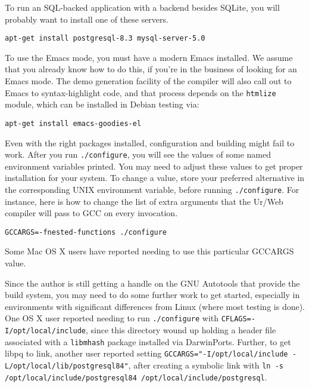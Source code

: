 \documentclass{article}
\begin{document}
To run an SQL-backed application with a backend besides SQLite, you will probably want to install one of these servers.

\begin{verbatim}
apt-get install postgresql-8.3 mysql-server-5.0
\end{verbatim}

To use the Emacs mode, you must have a modern Emacs installed.  We assume that you already know how to do this, if you're in the business of looking for an Emacs mode.  The demo generation facility of the compiler will also call out to Emacs to syntax-highlight code, and that process depends on the \texttt{htmlize} module, which can be installed in Debian testing via:

\begin{verbatim}
apt-get install emacs-goodies-el
\end{verbatim}

Even with the right packages installed, configuration and building might fail to work.  After you run \texttt{./configure}, you will see the values of some named environment variables printed.  You may need to adjust these values to get proper installation for your system.  To change a value, store your preferred alternative in the corresponding UNIX environment variable, before running \texttt{./configure}.  For instance, here is how to change the list of extra arguments that the Ur/Web compiler will pass to GCC on every invocation.

\begin{verbatim}
GCCARGS=-fnested-functions ./configure
\end{verbatim}

Some Mac OS X users have reported needing to use this particular GCCARGS value.

Since the author is still getting a handle on the GNU Autotools that provide the build system, you may need to do some further work to get started, especially in environments with significant differences from Linux (where most testing is done).  One OS X user reported needing to run \texttt{./configure} with \texttt{CFLAGS=-I/opt/local/include}, since this directory wound up holding a header file associated with a \texttt{libmhash} package installed via DarwinPorts.  Further, to get libpq to link, another user reported setting \texttt{GCCARGS="-I/opt/local/include -L/opt/local/lib/postgresql84"}, after creating a symbolic link with \texttt{ln -s /opt/local/include/postgresql84 /opt/local/include/postgresql}.
\end{document}
